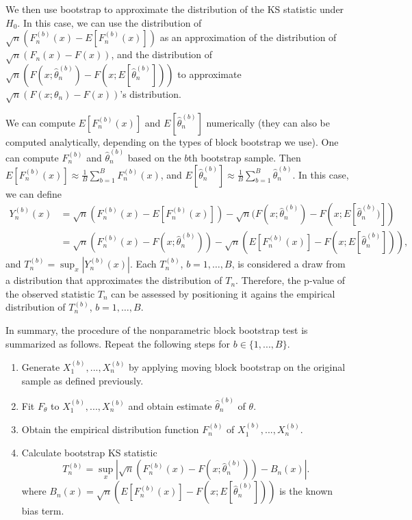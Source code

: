 \documentclass[12pt, titlepage, letterpaper]{article}
\begin{document}
{We then use bootstrap to approximate the distribution of
the KS statistic under $H_0$. In this case, we can 
use the distribution of $\sqrt{n}(F^{(b)}_n(x) - E[F^{(b)}_n(x)])$
as an approximation of the distribution of
$\sqrt{n}(F_n(x) - F(x))$,
and the distribution of 
$\sqrt{n}(F(x; \hat\theta^{(b)}_n) - F(x; E[\hat\theta^{(b)}_n]))$ to
approximate $\sqrt{n}(F(x; \theta_n) - F(x))$'s distribution.


We can compute $E[F^{(b)}_n(x)]$ and
$E[\hat\theta^{(b)}_n]$ numerically (they can also be computed analytically, 
depending on the types of block bootstrap we use). One can compute 
$F^{(b)}_n$ 
and $\hat\theta^{(b)}_n$ based on
the $b$th bootstrap sample. Then
$E[F^{(b)}_n(x)] \approx \frac{1}{B}\sum_{b = 1}^BF^{(b)}_n(x)$, and
$E[\hat\theta^{(b)}_n] \approx \frac{1}{B}\sum_{b = 1}^B\hat\theta^{(b)}_n$.
In this case, we can define
\begin{align*}
  Y^{(b)}_n(x) &= \sqrt{n}(F^{(b)}_n(x) - E[F^{(b)}_n(x)]) - 
             \sqrt{n}(F(x; \hat\theta^{(b)}_n) - F(x; E[\hat\theta^{(b)}_n)]) \\
           &= \sqrt{n}(F^{(b)}_n(x) - F(x; \hat\theta^{(b)}_n)) -
             \sqrt{n}(E[F^{(b)}_n(x)] - F(x; E[\hat\theta^{(b)}_n])),
\end{align*}
and $T^{(b)}_n = \sup_x|Y^{(b)}_n(x)|$. Each $T_n^{(b)}$,
$b =1, \ldots, B$, is considered a draw from a distribution that approximates
the distribution of $T_n$. Therefore, the p-value of the observed statistic
$T_n$ can be assessed by positioning it agains the empirical distribution of
$T_n^{(b)}$, $b = 1, \ldots, B$.


In summary, the procedure of the nonparametric block bootstrap test is 
summarized as follows. Repeat the following steps for $b \in \{1, ..., B\}$.
\begin{enumerate}
\item
  Generate $X^{(b)}_1,...,X^{(b)}_n$ by applying moving block bootstrap 
  on the original sample as
  defined previously.
\item
  Fit $F_\theta$ to $X^{(b)}_1,...,X^{(b)}_n$ and obtain estimate 
	$\hat\theta^{(b)}_n$ of $\theta$.
\item
  Obtain the empirical distribution function $F^{(b)}_n$ of
  $X^{(b)}_1,...,X^{(b)}_n$. 
\item
  Calculate bootstrap KS statistic
  \[
    T^{(b)}_n = \sup_x | \sqrt{n}\left(F^{(b)}_n(x) 
    - F(x; \hat\theta^{(b)}_n)\right) - B_n(x) |.
  \]
  where 
  $B_{n}(x) = \sqrt{n}(E[F^{(b)}_n(x)] - 
  F(x; E[\hat\theta^{(b)}_n]))$ is the known
  bias term.
\end{enumerate}


}
\end{document}
